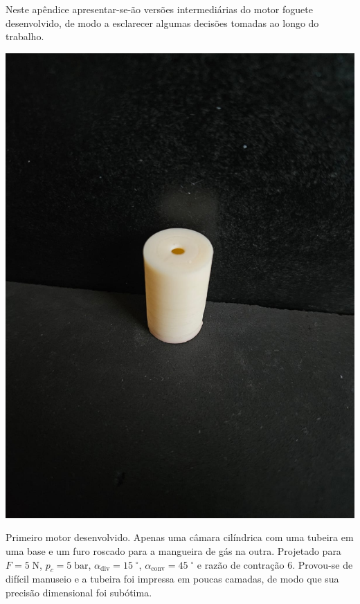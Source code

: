 Neste apêndice apresentar-se-ão versões intermediárias do motor foguete desenvolvido, de modo a esclarecer algumas decisões tomadas ao longo do trabalho.

\begin{minipage}{.49\textwidth}
    \includegraphics[width=\textwidth]{img/app_dev_history/motor1.jpeg}
\end{minipage}
\begin{minipage}{.49\textwidth}
    Primeiro motor desenvolvido. Apenas uma câmara cilíndrica com uma tubeira em uma base e um furo roscado para a mangueira de gás na outra. Projetado para \(F = 5\;\mathrm{N}\), \(p_c = 5\;\mathrm{bar}\), \(\alpha_{\mathrm{div}} = 15\;\mathrm{^\circ}\), \(\alpha_{\mathrm{conv}} = 45\;\mathrm{^\circ}\) e razão de contração 6. Provou-se de difícil manuseio e a tubeira foi impressa em poucas camadas, de modo que sua precisão dimensional foi subótima.
\end{minipage}

